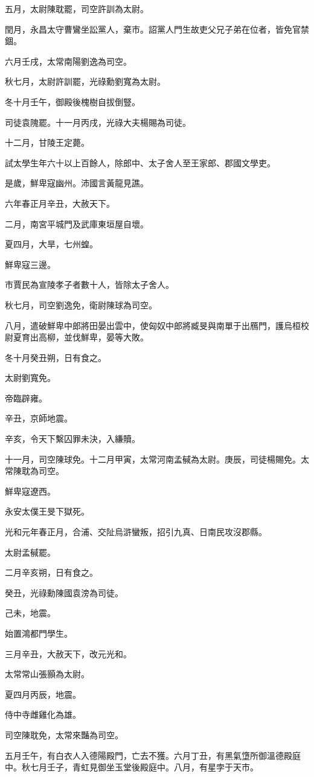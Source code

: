 \begin{pinyinscope}
五月，太尉陳耽罷，司空許訓為太尉。

閏月，永昌太守曹鸞坐訟黨人，棄市。詔黨人門生故吏父兄子弟在位者，皆免官禁錮。

六月壬戌，太常南陽劉逸為司空。

秋七月，太尉許訓罷，光祿勳劉寬為太尉。

冬十月壬午，御殿後槐樹自拔倒豎。

司徒袁隗罷。十一月丙戌，光祿大夫楊賜為司徒。

十二月，甘陵王定薨。

試太學生年六十以上百餘人，除郎中、太子舍人至王家郎、郡國文學吏。

是歲，鮮卑寇幽州。沛國言黃龍見譙。

六年春正月辛丑，大赦天下。

二月，南宮平城門及武庫東垣屋自壞。

夏四月，大旱，七州蝗。

鮮卑寇三邊。

市賈民為宣陵孝子者數十人，皆除太子舍人。

秋七月，司空劉逸免，衛尉陳球為司空。

八月，遣破鮮卑中郎將田晏出雲中，使匈奴中郎將臧旻與南單于出鴈門，護烏桓校尉夏育出高柳，並伐鮮卑，晏等大敗。

冬十月癸丑朔，日有食之。

太尉劉寬免。

帝臨辟雍。

辛丑，京師地震。

辛亥，令天下繫囚罪未決，入縑贖。

十一月，司空陳球免。十二月甲寅，太常河南孟戫為太尉。庚辰，司徒楊賜免。太常陳耽為司空。

鮮卑寇遼西。

永安太僕王旻下獄死。

光和元年春正月，合浦、交阯烏滸蠻叛，招引九真、日南民攻沒郡縣。

太尉孟戫罷。

二月辛亥朔，日有食之。

癸丑，光祿勳陳國袁滂為司徒。

己未，地震。

始置鴻都門學生。

三月辛丑，大赦天下，改元光和。

太常常山張顥為太尉。

夏四月丙辰，地震。

侍中寺雌雞化為雄。

司空陳耽免，太常來豔為司空。

五月壬午，有白衣人入德陽殿門，亡去不獲。六月丁丑，有黑氣墯所御溫德殿庭中。秋七月壬子，青虹見御坐玉堂後殿庭中。八月，有星孛于天巿。


\end{pinyinscope}
